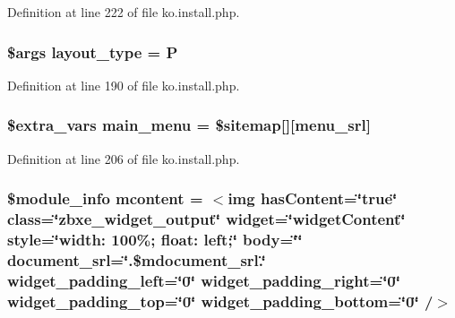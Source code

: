Definition at line 222 of file ko.\+install.\+php.

\subsubsection[{\texorpdfstring{layout\+\_\+type}{layout_type}}]{\setlength{\rightskip}{0pt plus 5cm}\$args layout\+\_\+type = \textquotesingle{}P\textquotesingle{}}\hypertarget{ko_8install_8php_a0532d89570cfdaebc628afac2ff5a81b}{}\label{ko_8install_8php_a0532d89570cfdaebc628afac2ff5a81b}


Definition at line 190 of file ko.\+install.\+php.

\subsubsection[{\texorpdfstring{main\+\_\+menu}{main_menu}}]{\setlength{\rightskip}{0pt plus 5cm}\${\bf extra\+\_\+vars} main\+\_\+menu = \$sitemap\mbox{[}\textquotesingle{}\mbox{]}\mbox{[}\textquotesingle{}menu\+\_\+srl\textquotesingle{}\mbox{]}}\hypertarget{ko_8install_8php_ac71104c770b8ced3891f35849d3f2906}{}\label{ko_8install_8php_ac71104c770b8ced3891f35849d3f2906}


Definition at line 206 of file ko.\+install.\+php.

\subsubsection[{\texorpdfstring{mcontent}{mcontent}}]{\setlength{\rightskip}{0pt plus 5cm}\$module\+\_\+info {\bf mcontent} = \textquotesingle{}$<$img has\+Content=\char`\"{}true\char`\"{} class=\char`\"{}zbxe\+\_\+widget\+\_\+output\char`\"{} widget=\char`\"{}widget\+Content\char`\"{} style=\char`\"{}width\+: 100\%; float\+: left;\char`\"{} body=\char`\"{}\char`\"{} document\+\_\+srl=\char`\"{}\textquotesingle{}.\$mdocument\+\_\+srl.\textquotesingle{}\char`\"{} widget\+\_\+padding\+\_\+left=\char`\"{}0\char`\"{} widget\+\_\+padding\+\_\+right=\char`\"{}0\char`\"{} widget\+\_\+padding\+\_\+top=\char`\"{}0\char`\"{} widget\+\_\+padding\+\_\+bottom=\char`\"{}0\char`\"{} /$>$\textquotesingle{}}\hypertarget{ko_8install_8php_a9da4bb6e77356bb68ae0e05dbd9f5e2f}{}\label{ko_8install_8php_a9da4bb6e77356bb68ae0e05dbd9f5e2f}


